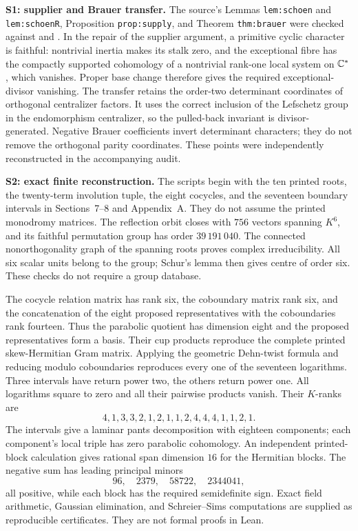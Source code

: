 \textbf{S1: supplier and Brauer transfer.}
The source's Lemmas \texttt{lem:schoen} and \texttt{lem:schoenR}, Proposition \texttt{prop:supply}, and Theorem \texttt{thm:brauer} were checked against \citet[Theorem~2.0, pp.~11--12; Corollary~3.1, pp.~24--25; Lemmas~2.4--2.5, pp.~14--15]{Schoen88} and \citet[Theorem~3.2 and Lemma~3.1]{Milne99}. In the repair of the supplier argument, a primitive cyclic character is faithful: nontrivial inertia makes its stalk zero, and the exceptional fibre has the compactly supported cohomology of a nontrivial rank-one local system on $\mathbb C^*$, which vanishes. Proper base change therefore gives the required exceptional-divisor vanishing. The transfer retains the order-two determinant coordinates of orthogonal centralizer factors. It uses the correct inclusion of the Lefschetz group in the endomorphism centralizer, so the pulled-back invariant is divisor-generated. Negative Brauer coefficients invert determinant characters; they do not remove the orthogonal parity coordinates. These points were independently reconstructed in the accompanying audit.

\textbf{S2: exact finite reconstruction.}
The scripts begin with the ten printed roots, the twenty-term involution tuple, the eight cocycles, and the seventeen boundary intervals in Sections~7--8 and Appendix~A. They do not assume the printed monodromy matrices. The reflection orbit closes with $756$ vectors spanning $K^6$, and its faithful permutation group has order $39\,191\,040$. The connected nonorthogonality graph of the spanning roots proves complex irreducibility. All six scalar units belong to the group; Schur's lemma then gives centre of order six. These checks do not require a group database.

The cocycle relation matrix has rank six, the coboundary matrix rank six, and the concatenation of the eight proposed representatives with the coboundaries rank fourteen. Thus the parabolic quotient has dimension eight and the proposed representatives form a basis. Their cup products reproduce the complete printed skew-Hermitian Gram matrix. Applying the geometric Dehn-twist formula and reducing modulo coboundaries reproduces every one of the seventeen logarithms. Three intervals have return power two, the others return power one. All logarithms square to zero and all their pairwise products vanish. Their $K$-ranks are
\[
 4,1,3,3,2,1,2,1,1,2,4,4,4,1,1,2,1.
\]
The intervals give a laminar pants decomposition with eighteen components; each component's local triple has zero parabolic cohomology. An independent printed-block calculation gives rational span dimension $16$ for the Hermitian blocks. The negative sum has leading principal minors
\[
 96,\quad2379,\quad58722,\quad2344041,
\]
all positive, while each block has the required semidefinite sign. Exact field arithmetic, Gaussian elimination, and Schreier--Sims computations are supplied as reproducible certificates. They are not formal proofs in Lean.

